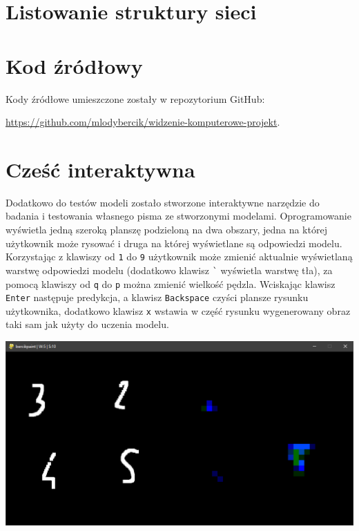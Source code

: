 \documentclass[10pt]{article}
\begin{document}
\newpage
\appendix

\section{Listowanie struktury sieci}
\label{app:listowanie}
\begin{center}
  
\end{center}

\section{Kod źródłowy}
Kody źródłowe umieszczone zostały w repozytorium GitHub:

\noindent \url{https://github.com/mlodybercik/widzenie-komputerowe-projekt}.

\section{Cześć interaktywna}

Dodatkowo do testów modeli zostało stworzone interaktywne narzędzie do badania i testowania własnego pisma ze stworzonymi modelami. Oprogramowanie wyświetla jedną szeroką planszę podzieloną na dwa obszary, jedna na której użytkownik może rysować i druga na której wyświetlane są odpowiedzi modelu. Korzystając z klawiszy od \verb+1+ do \verb+9+ użytkownik może zmienić aktualnie wyświetlaną warstwę odpowiedzi modelu (dodatkowo klawisz \verb+`+ wyświetla warstwę tła), za pomocą klawiszy od \verb+q+ do \verb+p+ można zmienić wielkość pędzla. Wciskając klawisz \verb+Enter+ następuje predykcja, a klawisz \verb+Backspace+ czyści plansze rysunku użytkownika, dodatkowo klawisz \verb+x+ wstawia w część rysunku wygenerowany obraz taki sam jak użyty do uczenia modelu.

\begin{center}
  \includegraphics[width=0.75\linewidth]{figures/bercikpaint.png}
\end{center}
\end{document}
